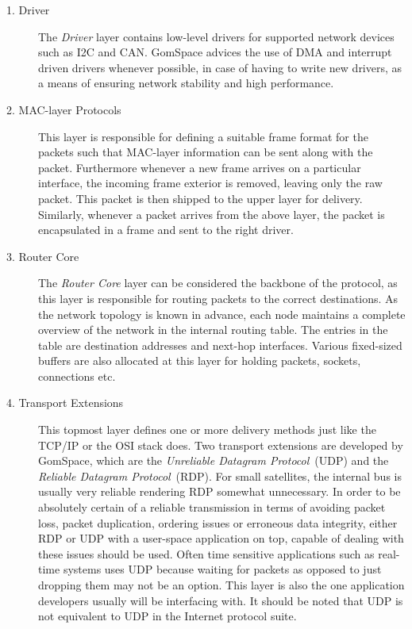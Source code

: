 \begin{description}
	\item[1. Driver] The \textit{Driver} layer contains low-level drivers for supported network devices such as I2C and CAN. GomSpace advices the use of DMA and interrupt driven drivers whenever possible, in case of having to write new drivers, as a means of ensuring network stability and high performance.
	\item[2. MAC-layer Protocols] This layer is responsible for defining a suitable frame format for the packets such that MAC-layer information can be sent along with the packet. Furthermore whenever a new frame arrives on a particular interface, the incoming frame exterior is removed, leaving only the raw packet. This packet is then shipped to the upper layer for delivery. Similarly, whenever a packet arrives from the above layer, the packet is encapsulated in a frame and sent to the right driver.
	\item[3. Router Core] The \textit{Router Core} layer can be considered the backbone of the protocol, as this layer is responsible for routing packets to the correct destinations. As the network topology is known in advance, each node maintains a complete overview of the network in the internal routing table. The entries in the table are destination addresses and next-hop interfaces. Various fixed-sized buffers are also allocated at this layer for holding packets, sockets, connections etc.
	\item[4. Transport Extensions] This topmost layer defines one or more delivery methods just like the TCP/IP or the OSI stack does. Two transport extensions are developed by GomSpace, which are the \textit{Unreliable Datagram Protocol}~(UDP) and the \textit{Reliable Datagram Protocol}~(RDP). For small satellites, the internal bus is usually very reliable rendering RDP somewhat unnecessary. In order to be absolutely certain of a reliable transmission in terms of avoiding packet loss, packet duplication, ordering issues or erroneous data integrity, either RDP or UDP with a user-space application on top, capable of dealing with these issues should be used. Often time sensitive applications such as real-time systems uses UDP because waiting for packets as opposed to just dropping them may not be an option. This layer is also the one application developers usually will be interfacing with. It should be noted that UDP is not equivalent to UDP in the Internet protocol suite.

\end{description}
  
